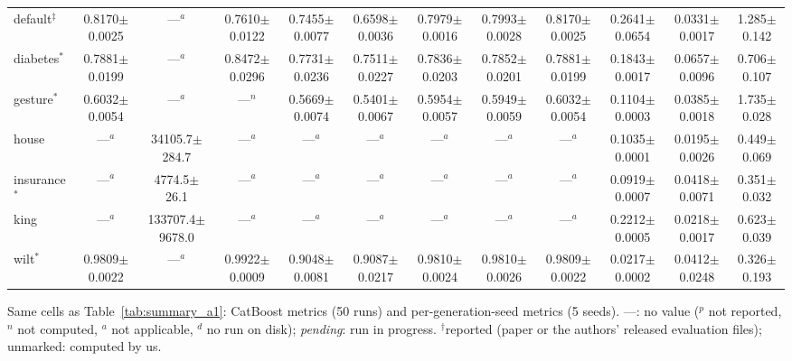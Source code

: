 \begin{table}[t]
{\begin{tabular}{lccccccccccc}
default$^\ddagger$ & 0.8170{\scriptsize$\pm$0.0025} & ---$^{a}$ & 0.7610{\scriptsize$\pm$0.0122} & 0.7455{\scriptsize$\pm$0.0077} & 0.6598{\scriptsize$\pm$0.0036} & 0.7979{\scriptsize$\pm$0.0016} & 0.7993{\scriptsize$\pm$0.0028} & 0.8170{\scriptsize$\pm$0.0025} & 0.2641{\scriptsize$\pm$0.0654} & 0.0331{\scriptsize$\pm$0.0017} & 1.285{\scriptsize$\pm$0.142} \\
diabetes$^{*}$ & 0.7881{\scriptsize$\pm$0.0199} & ---$^{a}$ & 0.8472{\scriptsize$\pm$0.0296} & 0.7731{\scriptsize$\pm$0.0236} & 0.7511{\scriptsize$\pm$0.0227} & 0.7836{\scriptsize$\pm$0.0203} & 0.7852{\scriptsize$\pm$0.0201} & 0.7881{\scriptsize$\pm$0.0199} & 0.1843{\scriptsize$\pm$0.0017} & 0.0657{\scriptsize$\pm$0.0096} & 0.706{\scriptsize$\pm$0.107} \\
gesture$^{*}$ & 0.6032{\scriptsize$\pm$0.0054} & ---$^{a}$ & ---$^{n}$ & 0.5669{\scriptsize$\pm$0.0074} & 0.5401{\scriptsize$\pm$0.0067} & 0.5954{\scriptsize$\pm$0.0057} & 0.5949{\scriptsize$\pm$0.0059} & 0.6032{\scriptsize$\pm$0.0054} & 0.1104{\scriptsize$\pm$0.0003} & 0.0385{\scriptsize$\pm$0.0018} & 1.735{\scriptsize$\pm$0.028} \\
house & ---$^{a}$ & 34105.7{\scriptsize$\pm$284.7} & ---$^{a}$ & ---$^{a}$ & ---$^{a}$ & ---$^{a}$ & ---$^{a}$ & ---$^{a}$ & 0.1035{\scriptsize$\pm$0.0001} & 0.0195{\scriptsize$\pm$0.0026} & 0.449{\scriptsize$\pm$0.069} \\
insurance$^{*}$ & ---$^{a}$ & 4774.5{\scriptsize$\pm$26.1} & ---$^{a}$ & ---$^{a}$ & ---$^{a}$ & ---$^{a}$ & ---$^{a}$ & ---$^{a}$ & 0.0919{\scriptsize$\pm$0.0007} & 0.0418{\scriptsize$\pm$0.0071} & 0.351{\scriptsize$\pm$0.032} \\
king & ---$^{a}$ & 133707.4{\scriptsize$\pm$9678.0} & ---$^{a}$ & ---$^{a}$ & ---$^{a}$ & ---$^{a}$ & ---$^{a}$ & ---$^{a}$ & 0.2212{\scriptsize$\pm$0.0005} & 0.0218{\scriptsize$\pm$0.0017} & 0.623{\scriptsize$\pm$0.039} \\
wilt$^{*}$ & 0.9809{\scriptsize$\pm$0.0022} & ---$^{a}$ & 0.9922{\scriptsize$\pm$0.0009} & 0.9048{\scriptsize$\pm$0.0081} & 0.9087{\scriptsize$\pm$0.0217} & 0.9810{\scriptsize$\pm$0.0024} & 0.9810{\scriptsize$\pm$0.0026} & 0.9809{\scriptsize$\pm$0.0022} & 0.0217{\scriptsize$\pm$0.0002} & 0.0412{\scriptsize$\pm$0.0248} & 0.326{\scriptsize$\pm$0.193} \\
\bottomrule
\end{tabular}}
\par\smallskip\footnotesize Same cells as Table~\ref{tab:summary_a1}: CatBoost metrics (50 runs) and per-generation-seed metrics (5 seeds). ---: no value ($^{p}$ not reported, $^{n}$ not computed, $^{a}$ not applicable, $^{d}$ no run on disk); \emph{pending}: run in progress. $^\dagger$reported (paper or the authors' released evaluation files); unmarked: computed by us.
\end{table}
